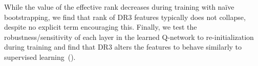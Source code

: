 While the value of the effective rank decreases during training with na\"ive bootstrapping, {we find that rank of DR3 features typically does not collapse}, despite no explicit term encouraging this. 
Finally, we test the robustness/sensitivity of each layer in the learned Q-network to re-initialization~\citep{zhang2019all} during training and find that DR3 alters the features to behave similarly to supervised learning~().


